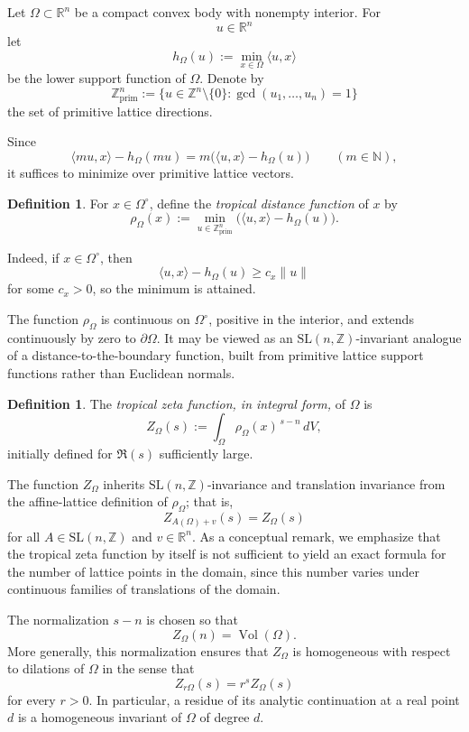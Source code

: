 \documentclass[a4paper,american,11pt]{amsart}
\theoremstyle{plain}
\theoremstyle{definition}
\newtheorem{definition}[theorem]{Definition}
\newcommand{\N}{\mathbb N}
\newcommand{\Z}{\mathbb Z}
\newcommand{\R}{\mathbb R}
\begin{document}
Let \(\Omega\subset \R^n\) be a compact convex body with nonempty interior.
For
\[
u\in \R^n
\]
let
\[
h_\Omega(u):=\min_{x\in \Omega}\langle u,x\rangle
\]
be the lower support function of \(\Omega\). Denote by
\[
\Z^n_{\mathrm{prim}}
:=
\{u\in \Z^n\setminus\{0\}:\gcd(u_1,\dots,u_n)=1\}
\]
the set of primitive lattice directions.

Since
\[
\langle mu,x\rangle-h_\Omega(mu)
=
m\bigl(\langle u,x\rangle-h_\Omega(u)\bigr)
\qquad (m\in \N),
\]
it suffices to minimize over primitive lattice vectors.

\begin{definition}
For \(x\in \Omega^\circ\), define the \emph{tropical distance function} of
\(x\) by
\[
\rho_\Omega(x)
:=
\min_{u\in \Z^n_{\mathrm{prim}}}
\bigl(\langle u,x\rangle-h_\Omega(u)\bigr).
\]
\end{definition}

Indeed, if \(x\in \Omega^\circ\), then
\[
\langle u,x\rangle-h_\Omega(u) \ge c_x \|u\|
\]
for some \(c_x>0\), so the minimum is attained.

The function \(\rho_\Omega\) is continuous on \(\Omega^\circ\), positive in
the interior, and extends continuously by zero to \(\partial\Omega\). It may
be viewed as an \(\mathrm{SL}(n,\Z)\)-invariant analogue of a
distance-to-the-boundary function, built from primitive lattice support
functions rather than Euclidean normals.

\begin{definition}
The \emph{tropical zeta function, in integral form,} of \(\Omega\) is
\[
Z_\Omega(s):=\int_\Omega \rho_\Omega(x)^{\,s-n}\,dV,
\]
initially defined for \(\Re(s)\) sufficiently large.
\end{definition}

The function \(Z_\Omega\) inherits \(\mathrm{SL}(n,\Z)\)-invariance and
translation invariance from the affine-lattice definition of
\(\rho_\Omega\); that is,
\[
Z_{A(\Omega)+v}(s)=Z_{\Omega}(s)
\]
for all \(A\in\mathrm{SL}(n,\Z)\) and \(v\in\R^n\). As a conceptual remark,
we emphasize that the tropical zeta function by itself is not sufficient to
yield an exact formula for the number of lattice points in the domain, since
this number varies under continuous families of translations of the domain.

The normalization \(s-n\) is chosen so that
\[
Z_\Omega(n)=\operatorname{Vol}(\Omega).
\]
More generally, this normalization ensures that \(Z_\Omega\) is homogeneous
with respect to dilations of \(\Omega\) in the sense that
\[
Z_{r\Omega}(s)=r^sZ_\Omega(s)
\]
for every \(r>0\). In particular, a residue of its analytic continuation at a
real point \(d\) is a homogeneous invariant of \(\Omega\) of degree \(d\).
\end{document}
